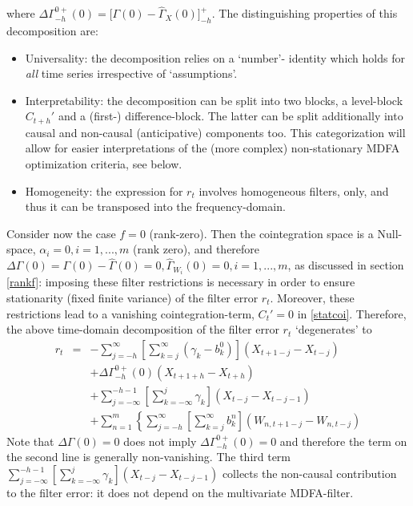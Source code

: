 \documentclass[11pt]{article}
\begin{document}
where $\Delta\Gamma_{-h}^{0+}(0)=\bigg[\Gamma(0)-\hat{\Gamma}_X(0)\bigg]_{-h}^+$. The distinguishing properties of this decomposition are:
\begin{itemize}
\item Universality: the decomposition relies on a `number'- identity which holds for \emph{all} time series irrespective of `assumptions'. 
\item Interpretability: the decomposition can be split into two blocks, a level-block $C_{t+h}'$ and a (first-) difference-block. The latter can be split additionally into causal and non-causal (anticipative) components too. This categorization will allow for easier interpretations of the (more complex) non-stationary MDFA optimization criteria, see below.
\item Homogeneity: the expression for $r_t$ involves homogeneous filters, only, and thus it can be transposed into the frequency-domain.
\end{itemize}
Consider now the case $f=0$ (rank-zero). Then the cointegration space is a Null-space, $\alpha_i=0, i=1,...,m$ (rank zero), and therefore $\Delta\Gamma(0)=\Gamma(0)-\hat{\Gamma}(0)=0, \hat{\Gamma}_{W_i}(0)=0, i=1,...,m$, as discussed in section \ref{rankf}: imposing these filter restrictions is necessary in order to ensure stationarity (fixed finite variance) of the filter  error $r_t$. Moreover, these restrictions lead to a vanishing cointegration-term, $C_t'=0$ in \ref{statcoi}. Therefore, the above time-domain decomposition of the filter error $r_t$ `degenerates' to 
\begin{eqnarray}\label{intra000}
r_t&=&-\sum_{j=-h}^\infty
\left[\sum_{k=j}^\infty({\gamma}_{k}-b_k^0)\right]
(X_{t+1-j}-X_{t-j})\\
&&+\Delta\Gamma_{-h}^{0+}(0)
(X_{t+1+h}-X_{t+h})\nonumber\\
&&+\sum_{j=-\infty}^{-h-1}\left[\sum_{k=-\infty}^j \gamma_k\right](X_{t-j}-X_{t-j-1})\nonumber\\
&&+\sum_{n=1}^m\left\{\sum_{j=-h}^\infty
\left[\sum_{k=j}^\infty b_k^n\right]
(W_{n,t+1-j}-W_{n,t-j})\right.\nonumber
\end{eqnarray}
Note that $\Delta\Gamma(0)=0$ does not imply $\Delta\Gamma_{-h}^{0+}(0)=0$ and therefore the term on the second line is generally non-vanishing. The third term $\sum_{j=-\infty}^{-h-1}\left[\sum_{k=-\infty}^j \gamma_k\right](X_{t-j}-X_{t-j-1})$  collects the non-causal contribution to the filter error: it does not depend on the multivariate MDFA-filter.
\end{document}
